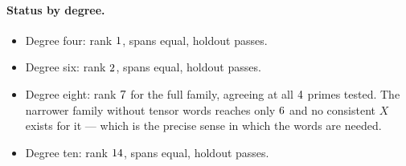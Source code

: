 \paragraph{Status by degree.}
\begin{itemize}\itemsep2pt
\item Degree four: rank $1$, spans equal, holdout passes.
\item Degree six: rank $2$, spans equal, holdout passes.
\item Degree eight: rank $7$ for the full family, agreeing at all
      $4$ primes tested. The narrower family without tensor
      words reaches only $6$ and no consistent $X$ exists
      for it --- which is the precise sense in which the words are needed.
\item Degree ten: rank $14$, spans equal, holdout passes.
\end{itemize}
